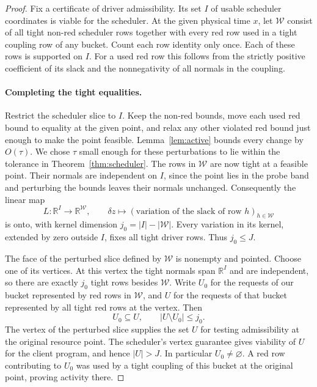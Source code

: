 \begin{proof}
Fix a certificate of driver admissibility. Its set \(I\) of usable
scheduler coordinates is viable for the scheduler. At the given
physical time \(x\), let \(\mathcal W\) consist of all tight non-red
scheduler rows together with every red row used in a tight coupling
row of any bucket. Count each row identity only once. Each of these
rows is supported on \(I\). For a used red row this follows from the
strictly positive coefficient of its slack and the nonnegativity of
all normals in the coupling.

\paragraph{Completing the tight equalities.}
Restrict the scheduler slice to \(I\). Keep the non-red bounds, move
each used red bound to equality at the given point, and relax any
other violated red bound just enough to make the point feasible.
Lemma~\ref{lem:active} bounds every change by \(O(\tau)\). We chose
\(\tau\) small enough for these perturbations to lie within the
tolerance in Theorem~\ref{thm:scheduler}. The rows in \(\mathcal W\)
are now tight at a feasible point. Their normals are independent
on \(I\), since the point lies in the probe band and perturbing the
bounds leaves their normals unchanged. Consequently the linear map
\[
       L:\mathbb R^I\longrightarrow\mathbb R^{\mathcal W},
       \qquad \delta z\longmapsto
       (\text{variation of the slack of row }h)_{h\in\mathcal W}
\]
is onto, with kernel dimension \(j_0=|I|-|\mathcal W|\). Every
variation in its kernel, extended by zero outside \(I\), fixes all
tight driver rows. Thus \(j_0\le J\).

The face of the perturbed slice defined by \(\mathcal W\) is nonempty
and pointed. Choose one of its vertices. At this vertex the tight
normals span \(\mathbb R^I\) and are independent, so there are exactly
\(j_0\) tight rows besides \(\mathcal W\). Write \(U_0\) for the
requests of our bucket represented by red rows in \(\mathcal W\),
and \(U\) for the requests of that bucket represented by all tight
red rows at the vertex. Then
\[
              U_0\subseteq U,\qquad |U\setminus U_0|\le j_0 .
\]
The vertex of the perturbed slice supplies the set \(U\) for testing
admissibility at the original resource point. The scheduler's vertex
guarantee gives viability of \(U\) for the client program, and hence \(|U|>J\). In particular \(U_0\ne\varnothing\).
A red row contributing to \(U_0\) was used by a tight coupling of this
bucket at the original point, proving activity there.


\end{proof}
